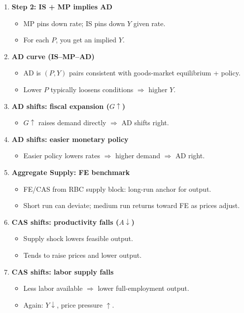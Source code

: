 \documentclass[11pt]{article}
\begin{document}
\begin{enumerate}
\item \textbf{Step 2: IS + MP implies AD}
\begin{itemize}
\item MP pins down rate; IS pins down $Y$ given rate.
\item For each $P$, you get an implied $Y$.
\end{itemize}

\item \textbf{AD curve (IS--MP--AD)}
\begin{itemize}
\item AD is $(P,Y)$ pairs consistent with goods-market equilibrium + policy.
\item Lower $P$ typically loosens conditions $\Rightarrow$ higher $Y$.
\end{itemize}

\item \textbf{AD shifts: fiscal expansion ($G\uparrow$)}
\begin{itemize}
\item $G\uparrow$ raises demand directly $\Rightarrow$ AD shifts right.
\end{itemize}

\item \textbf{AD shifts: easier monetary policy}
\begin{itemize}
\item Easier policy lowers rates $\Rightarrow$ higher demand $\Rightarrow$ AD right.
\end{itemize}

\item \textbf{Aggregate Supply: FE benchmark}
\begin{itemize}
\item FE/CAS from RBC supply block: long-run anchor for output.
\item Short run can deviate; medium run returns toward FE as prices adjust.
\end{itemize}

\item \textbf{CAS shifts: productivity falls ($A\downarrow$)}
\begin{itemize}
\item Supply shock lowers feasible output.
\item Tends to raise prices and lower output.
\end{itemize}

\item \textbf{CAS shifts: labor supply falls}
\begin{itemize}
\item Less labor available $\Rightarrow$ lower full-employment output.
\item Again: $Y\downarrow$, price pressure $\uparrow$.
\end{itemize}


\end{enumerate}
\end{document}
